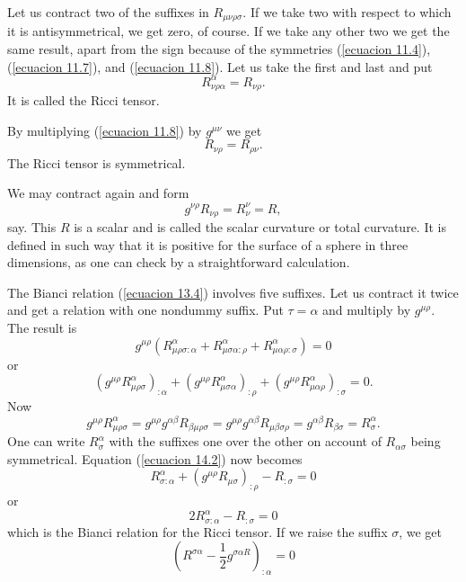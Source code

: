 Let us contract two of the suffixes in $R_{\mu\nu\rho\sigma}$. If we take two with respect to which it is 
antisymmetrical, we get zero, of course. If we take any other two we get the same result, apart from the sign because 
of the symmetries (\ref{ecuacion 11.4}), (\ref{ecuacion 11.7}), and (\ref{ecuacion 11.8}). Let us take the first and 
last and put
\[
R^{\alpha}_{\nu\rho\alpha} = R_{\nu\rho}.
\]
It is called the Ricci tensor.

By multiplying (\ref{ecuacion 11.8}) by $g^{\mu\nu}$ we get 
\begin{equation}
 \label{ecuacion 14.1}
 R_{\nu\rho} = R_{\rho\nu}.
\end{equation}
The Ricci tensor is symmetrical.

We may contract again and form
\[
g^{\nu\rho}R_{\nu\rho} = R^{\nu}_{\nu} = R,
\]
say. This $R$ is a scalar and is called the scalar curvature or total curvature. It is defined in such way that it is 
positive for the surface of a sphere in three dimensions, as one can check by a straightforward calculation.

The Bianci relation (\ref{ecuacion 13.4}) involves five suffixes. Let us contract it twice and get a relation with one 
nondummy suffix. Put $\tau = \alpha$ and multiply by $g^{\mu\rho}$. The result is
\[
g^{\mu\rho}\left(
R^{\alpha}_{\mu\rho\sigma:\alpha} +
R^{\alpha}_{\mu\sigma\alpha:\rho} +
R^{\alpha}_{\mu\alpha\rho:\sigma}
\right) = 0
\]
or
\begin{equation}
 \label{ecuacion 14.2}
 \left( g^{\mu\rho} R^{\alpha}_{\mu\rho\sigma}\right)_{:\alpha} +
 \left( g^{\mu\rho} R^{\alpha}_{\mu\sigma\alpha}\right)_{:\rho} +
 \left( g^{\mu\rho} R^{\alpha}_{\mu\alpha\rho}\right)_{:\sigma}
 = 0 .
\end{equation}
Now
\[
 g^{\mu\rho} R^{\alpha}_{\mu\rho\sigma} =
  g^{\mu\rho}g^{\alpha\beta}R_{\beta\mu\rho\sigma} =
  g^{\mu\rho}g^{\alpha\beta}R_{\mu\beta\sigma\rho} =
  g^{\alpha\beta}R_{\beta\sigma} = R^{\alpha}_{\sigma}.
\]
One can write $R^{\alpha}_{\sigma}$ with the suffixes one over the other on account of $R_{\alpha\sigma}$ being 
symmetrical. Equation (\ref{ecuacion 14.2}) now becomes
\[
 R^{\alpha}_{\sigma:\alpha} + \left( g^{\mu\rho} R_{\mu\sigma} \right)_{:\rho} - R_{:\sigma} = 0
\]
or
\[
 2 R^{\alpha}_{\sigma:\alpha} - R_{:\sigma} = 0
\]
which is the Bianci relation for the Ricci tensor. If we raise the suffix $\sigma$, we get
\begin{equation}
 \label{ecuacion 14.3}
 \left( R^{\sigma \alpha} - \frac{1}{2} g^{\sigma \alpha R}\right)_{:\alpha} = 0
\end{equation}



